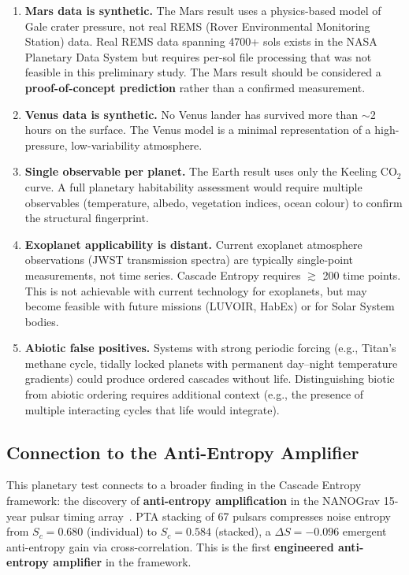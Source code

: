 \documentclass[12pt,a4paper]{article}
\begin{document}
\begin{enumerate}[leftmargin=*]
  \item \textbf{Mars data is synthetic.} The Mars result uses a
    physics-based model of Gale crater pressure, not real REMS
    (Rover Environmental Monitoring Station) data. Real REMS data
    spanning 4700+ sols exists in the NASA Planetary Data System but
    requires per-sol file processing that was not feasible in this
    preliminary study. The Mars result should be considered a
    \textbf{proof-of-concept prediction} rather than a confirmed
    measurement.
  \item \textbf{Venus data is synthetic.} No Venus lander has survived
    more than $\sim$2 hours on the surface. The Venus model is a
    minimal representation of a high-pressure, low-variability atmosphere.
  \item \textbf{Single observable per planet.} The Earth result uses only
    the Keeling CO$_2$ curve. A full planetary habitability assessment
    would require multiple observables (temperature, albedo, vegetation
    indices, ocean colour) to confirm the structural fingerprint.
  \item \textbf{Exoplanet applicability is distant.} Current exoplanet
    atmosphere observations (JWST transmission spectra) are typically
    single-point measurements, not time series. Cascade Entropy requires
    $\gtrsim$ 200 time points. This is not achievable with current
    technology for exoplanets, but may become feasible with future
    missions (LUVOIR, HabEx) or for Solar System bodies.
  \item \textbf{Abiotic false positives.} Systems with strong periodic
    forcing (e.g., Titan's methane cycle, tidally locked planets with
    permanent day--night temperature gradients) could produce ordered
    cascades without life. Distinguishing biotic from abiotic ordering
    requires additional context (e.g., the presence of multiple
    interacting cycles that life would integrate).
\end{enumerate}

\subsection{Connection to the Anti-Entropy Amplifier}

This planetary test connects to a broader finding in the Cascade Entropy
framework: the discovery of \textbf{anti-entropy amplification} in the
NANOGrav 15-year pulsar timing array~\cite{cascade_entropy_v5}. PTA
stacking of 67 pulsars compresses noise entropy from $S_c = 0.680$
(individual) to $S_c = 0.584$ (stacked), a $\Delta S = -0.096$ emergent
anti-entropy gain via cross-correlation. This is the first
\textbf{engineered anti-entropy amplifier} in the framework.
\end{document}
